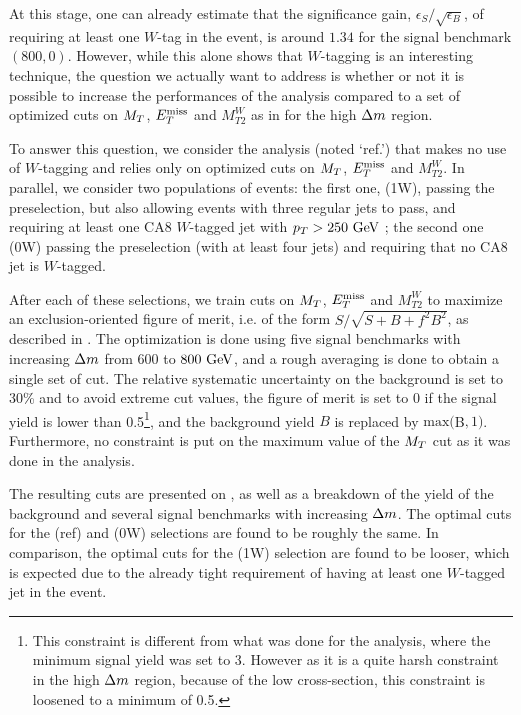     At this stage, one can already estimate that the significance gain, $\epsilon_S / \sqrt{\epsilon_B}$,
    of requiring at least one $W$-tag in the event, is around $1.34$ for the
    signal benchmark $(800,0)$. However, while this alone shows that $W$-tagging
    is an interesting technique, the question we actually want to address is whether or not
    it is possible to increase the performances of the analysis compared to a set
    of optimized cuts on $M_T$, $E_T^\text{miss}$ and $M_{T2}^{W}$ as in
     for the high $\Delta m$ region.

    To answer this question, we consider the analysis (noted `ref.') that makes
    no use of $W$-tagging
    and relies only on optimized cuts on $M_T$, $E_T^\text{miss}$ and $M_{T2}^{W}$. In parallel,
    we consider two populations of events: the first one, (1W), passing the preselection,
    but also allowing events with three regular jets to pass, and requiring at least
    one CA8 $W$-tagged jet with $p_T > 250~\text{GeV}$ ; the second one (0W) passing the
    preselection (with at least four jets) and requiring that no CA8 jet is $W$-tagged.

    After each of these selections, we train cuts on $M_T$, $E_T^\text{miss}$ and $M_{T2}^{W}$
    to maximize an exclusion-oriented figure of merit, i.e. of the form
    $S/\sqrt{S+B+f^2 B^2}$, as described in . The
    optimization is done using five signal benchmarks with increasing $\Delta m$ from
    $600$ to $800~\text{GeV}$, and a rough averaging is done to obtain a single set of cut.
    The relative systematic uncertainty on the background is set to 30\% and to avoid
    extreme cut values, the figure of merit is set to 0 if the signal yield is
    lower than 0.5\footnote{This constraint is different from what was done for
    the analysis, where the minimum signal yield was set to 3. However as it is
    a quite harsh constraint in the high $\Delta m$ region, because of the low
    cross-section, this constraint is loosened to a minimum of 0.5.}, and the
    background yield $B$ is replaced by $\text{max}($B$,1)$. Furthermore, no
    constraint is put on the maximum value of the $M_T$ cut as it was done in the
    analysis.

    The resulting cuts are
    presented on , as well as a breakdown of the
    yield of the background and several signal benchmarks with increasing $\Delta m$.
    The optimal cuts for the (ref) and (0W) selections are found to be roughly
    the same. In comparison, the optimal cuts for the (1W) selection are found
    to be looser, which is expected due to the already tight requirement of having
    at least one $W$-tagged jet in the event.

